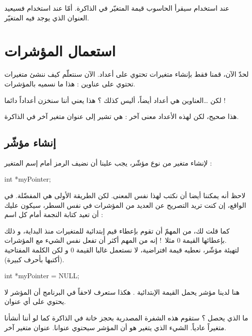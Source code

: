 عند استخدام
سيقرأ الحاسوب قيمة المتغيّر في الذاكرة. أمّا عند استخدام
فسيعيد العنوان الذي يوجد فيه المتغيّر.

\section{استعمال المؤشرات}

لحدّ الآن، قمنا فقط بإنشاء متغيرات تحتوي على أعداد. الآن سنتعلّم كيف ننشئ متغيرات تحتوي على عناوين : هذا ما نسميه بالمؤشرات.

\begin{question}
	لكن \dots العناوين هي أعداد أيضاً، أليس كذلك ؟ هذا يعني أننا سنخزن أعداداً دائما !
\end{question}

هذا صحيح، لكن لهذه الأعداد معنى آخر : هي تشير إلى عنوان متغير آخر في الذاكرة.

\subsection{إنشاء مؤشّر}

لإنشاء متغير من نوع مؤشّر، يجب علينا أن نضيف الرمز
\InlineCode{*}
أمام إسم المتغير :

\begin{Csource}
int *myPointer;
\end{Csource}

\begin{information}
لاحظ أنه يمكننا أيضا أن نكتب
لهذا نفس المعنى. لكن الطريقة الأولى هي المفضّلة. في الواقع، إن كنت تريد التصريح عن العديد من المؤشرات في نفس السطر، سيكون عليك أن تعيد كتابة النجمة أمام كل اسم :
\end{information}

كما قلت لك، من المهمّ أن تقوم بإعطاء قيم إبتدائية للمتغيرات منذ البداية، و ذلك بإعطائها القيمة 0 مثلا~! إنه من المهم أكثر أن تفعل نفس الشيء مع المؤشرات.\\
لتهيئة مؤشّر، نعطيه قيمة افتراضية، لا نستعمل غالبا القيمة 0 و لكن الكلمة المفتاحية
(أكتبها بأحرف كبيرة).

\begin{Csource}
int *myPointer = NULL;
\end{Csource}

هنا لدينا مؤشر يحمل القيمة الإبتدائية
.
هكذا ستعرف لاحقاً في البرنامج أن المؤشر لا يحتوي على أي عنوان.

ما الذي يحصل ؟ ستقوم هذه الشفرة المصدرية بحجز خانة في الذاكرة كما لو أننا أنشأنا متغيراً عادياً. الشيء الذي يتغير هو أن المؤشر سيحتوي عنوانا. عنوان متغير آخر.

